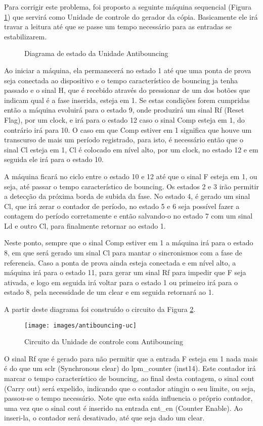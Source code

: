 Para corrigir este problema, foi proposto a seguinte máquina sequencial (Figura \ref{fig:antibouncing-diagrama}) que servirá como Unidade de controle do gerador da cópia. Basicamente ele irá travar a leitura até que se passe um tempo necessário para as entradas se estabilizarem.

\begin{figure}[!htp]
	\centering
	\caption{Diagrama de estado da Unidade Antibouncing}
	\label{fig:antibouncing-diagrama}
\end{figure}

Ao iniciar a máquina, ela permanecerá no estado 1 até que uma ponta de prova seja conectada ao dispositivo e o tempo característico de bouncing ja tenha passado e o sinal H, que é recebido através do pressionar de um dos botões que indicam qual é a fase inserida, esteja em 1. Se estas condições forem cumpridas então a máquina evoluirá para o estado 9, onde produzirá um sinal Rf (Reset Flag), por um clock, e irá para o estado 12 caso o sinal Comp esteja em 1, do contrário irá para 10. O caso em que Comp estiver em 1 significa que houve um transcurso de mais um período registrado, para isto, é necessário então que o sinal Cl esteja em 1, Cl é colocado em nível alto, por um clock, no estado 12 e em seguida ele irá para o estado 10.

A máquina ficará no ciclo entre o estado 10 e 12 até que o sinal F esteja em 1, ou seja, até passar o tempo característico de bouncing. Os estados 2 e 3 irão permitir a detecção da próxima borda de subida da fase. No estado 4, é gerado um sinal Cl, que irá zerar o contador de período, no estado 5 e 6 seja possível fazer a contagem do período corretamente e então salvando-o no estado 7 com um sinal Ld e outro Cl, para finalmente retornar ao estado 1.

Neste ponto, sempre que o sinal Comp estiver em 1 a máquina irá para o estado 8, em que será gerado um sinal Cl para mantar o sincronismos com a fase de referencia. Caso a ponta de prova ainda esteja conectada e em nível alto, a máquina irá para o estado 11, para gerar um sinal Rf para impedir que F seja ativada, e logo em seguida irá voltar para o estado 1 ou primeiro irá para o estado 8, pela necessidade de um clear e em seguida retornará ao 1.

A partir deste diagrama foi construído o circuito da Figura \ref{fig:antibouncing-uc}.

\begin{figure}[!htp]
	\centering
	\caption{Circuito da Unidade de controle com Antibouncing}
	\texttt{[image: images/antibouncing-uc]}	\label{fig:antibouncing-uc}
\end{figure}

O sinal Rf que é gerado para não permitir que a entrada F esteja em 1 nada mais é do que um sclr (Synchronous clear) do lpm\_counter (inst14). Este contador irá marcar o tempo característico de bouncing, ao final desta contagem, o sinal cout (Carry out) será expelido, indicando que o contador atingiu o seu limite, ou seja, passou-se o tempo necessário. Note que esta saída influencia o próprio contador, uma vez que o sinal cout é inserido na entrada cnt\_en (Counter Enable). Ao inseri-la, o contador será desativado, até que seja dado um clear.